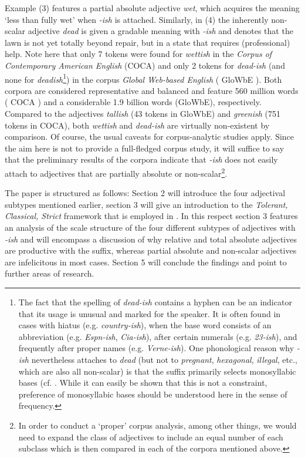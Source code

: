 \documentclass[output=paper
,modfonts
,nonflat]{langsci/langscibook}
\begin{document}
Example (3) features a partial absolute adjective  \textit{wet}, which acquires the meaning `less than fully wet' when \textit{-ish} is attached. Similarly, in (4) the inherently non-scalar adjective \textit{dead} is given a gradable meaning with \textit{-ish} and denotes that the lawn is not yet totally beyond repair, but in a state that requires (professional) help. Note here that only 7 tokens were found for \textit{wettish} in the \textit{Corpus of Contemporary American English} (COCA) and only 2 tokens for \textit{dead-ish} (and none for \textit{deadish}\footnote{The fact that the spelling of \textit{dead-ish} contains a hyphen can be an indicator that its usage is unusual and marked for the speaker. It is often found in cases with hiatus (e.g. \textit{country-ish}), when the base word consists of an abbreviation (e.g. \textit{Espn-ish}, \textit{Cia-ish}), after certain numerals (e.g. \textit{23-ish}), and frequently after proper names (e.g. \textit{Verne-ish}). One phonological reason why \textit{-ish} nevertheless attaches to \textit{dead} (but not to \textit{pregnant}, \textit{hexagonal}, \textit{illegal}, etc., which are also all non-scalar) is that the suffix primarily selects monosyllabic bases (cf. \textcite[235]{Dixon2014}. While it can easily be shown that this is not a constraint, preference of monosyllabic bases should be understood here in the sense of frequency.}) in the corpus \textit{Global Web-based English} ( GloWbE \citep{Davies2013}). Both corpora are considered representative and balanced and feature 560 million words ( COCA \citep{Davies2008}) and a considerable 1.9 billion words (GloWbE), respectively. Compared to the adjectives \textit{tallish} (43 tokens in GloWbE) and \textit{greenish} (751 tokens in COCA), both \textit{wettish} and \textit{dead-ish} are virtually non-existent by comparison. Of course, the usual caveats for corpus-analytic studies apply. Since the aim here is not to provide a full-fledged corpus study, it will suffice to say that the preliminary results of the corpora indicate that \textit{-ish} does not easily attach to adjectives that are partially absolute or non-scalar\footnote{In order to conduct a `proper' corpus analysis, among other things, we would need to expand the class of adjectives to include an equal number of each subclass which is then compared in each of the corpora mentioned above.}.

The paper is structured as follows: Section 2 will introduce the four adjectival subtypes mentioned earlier, section 3 will give an introduction to the \textit{Tolerant, Classical, Strict} framework that is employed in \citet{Burnett2017}. In this respect section 3 features an analysis of the scale structure of the four different subtypes of adjectives with \textit{-ish} and will encompass a discussion of why relative and total absolute adjectives are productive with the suffix, whereas partial absolute and non-scalar adjectives are infelicitous in most cases. Section 5 will conclude the findings and point to further areas of research.
\end{document}
